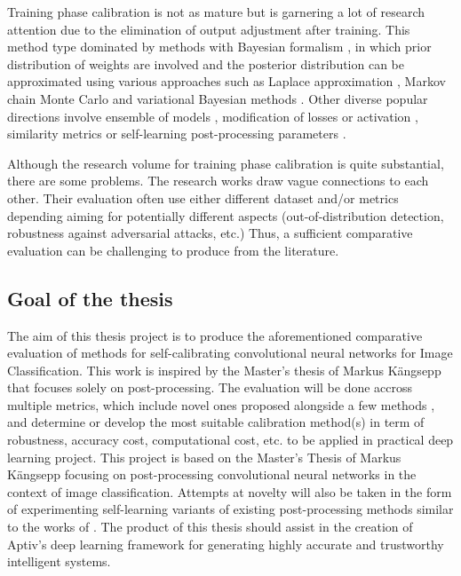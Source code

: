 \documentclass[a4paper]{article}
\begin{document}
Training phase calibration is not as mature but is garnering a lot of research attention due to the elimination of output adjustment after training. This method type dominated by methods with Bayesian formalism \cite{lakshminarayanan2017simple}, in which prior distribution of weights are involved and the posterior distribution can be approximated using various approaches such as Laplace approximation \cite{mackay1999bayesian}, Markov chain Monte Carlo \cite{Neal:1996:BLN:525544} and variational Bayesian methods \cite{Blundell:2015:WUN:3045118.3045290, NIPS2011_4329, pmlr-v48-louizos16}. Other diverse popular directions involve ensemble of models \cite{Gal:2016:DBA:3045390.3045502, lakshminarayanan2017simple}, modification of losses or activation \cite{DBLP:journals/corr/abs-1810-11586, DBLP:journals/corr/abs-1810-01861}, similarity metrics \cite{DBLP:journals/corr/abs-1803-04765} or self-learning post-processing parameters \cite{Neumann18c}.

\color{red}Although the research volume for training phase calibration is quite substantial, there are some problems. The research works draw vague connections to each other. Their evaluation often use either different dataset and/or metrics depending aiming for potentially different aspects (out-of-distribution detection, robustness against adversarial attacks, etc.) Thus, a sufficient comparative evaluation can be challenging to produce from the literature.   

\subsection{Goal of the thesis}

The aim of this thesis project is to produce the aforementioned comparative evaluation of methods for self-calibrating convolutional neural networks for Image Classification. This work is inspired by the Master's thesis of Markus Kängsepp \cite{DBLP:thesis/calibration} that focuses solely on post-processing. The evaluation will be done accross multiple metrics, which include novel ones proposed alongside a few methods \cite{NIPS2018_7798, DBLP:journals/corr/abs-1709-09844}, and determine or develop the most suitable calibration method(s) in term of robustness, accuracy cost, computational cost, etc. to be applied in practical deep learning project. This project is based on the Master's Thesis of Markus Kängsepp \cite{DBLP:thesis/calibration} focusing on post-processing convolutional neural networks in the context of image classification. Attempts at novelty will also be taken in the form of experimenting self-learning variants of existing post-processing methods similar to the works of \cite{Neumann18c}. The product of this thesis should assist in the creation of Aptiv's deep learning framework for generating highly accurate and trustworthy intelligent systems.
\end{document}
